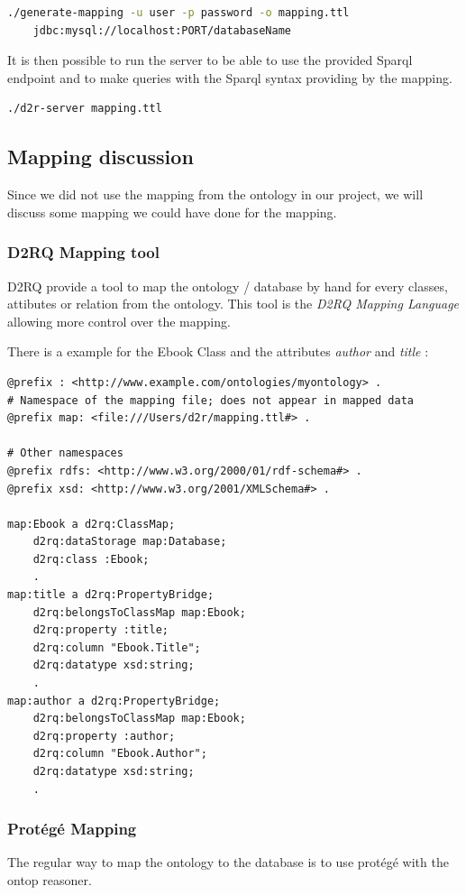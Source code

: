 \documentclass[a4paper,12pt]{article}
\begin{document}
\begin{lstlisting}[language=bash]
./generate-mapping -u user -p password -o mapping.ttl 
    jdbc:mysql://localhost:PORT/databaseName
\end{lstlisting}

It is then possible to run the server to be able to use the provided Sparql endpoint and to make queries with the Sparql syntax providing by the mapping.

\begin{lstlisting}
./d2r-server mapping.ttl
\end{lstlisting}

\subsection{Mapping discussion}
Since we did not use the mapping from the ontology in our project, we will discuss some mapping we could have done for the mapping.

\subsubsection{D2RQ Mapping tool}
D2RQ provide a tool to map the ontology / database by hand for every classes, attibutes or relation from the ontology. This tool is the \textit{D2RQ Mapping Language} allowing more control over the mapping.

There is a example for the Ebook Class and the attributes \textit{author} and \textit{title} : 

\begin{lstlisting}
@prefix : <http://www.example.com/ontologies/myontology> .
# Namespace of the mapping file; does not appear in mapped data
@prefix map: <file:///Users/d2r/mapping.ttl#> .

# Other namespaces
@prefix rdfs: <http://www.w3.org/2000/01/rdf-schema#> .
@prefix xsd: <http://www.w3.org/2001/XMLSchema#> .

map:Ebook a d2rq:ClassMap;
    d2rq:dataStorage map:Database;
    d2rq:class :Ebook;
    .
map:title a d2rq:PropertyBridge;
    d2rq:belongsToClassMap map:Ebook;
    d2rq:property :title;
    d2rq:column "Ebook.Title";
    d2rq:datatype xsd:string;
    .
map:author a d2rq:PropertyBridge;
    d2rq:belongsToClassMap map:Ebook;
    d2rq:property :author;
    d2rq:column "Ebook.Author"; 
    d2rq:datatype xsd:string;
    .
\end{lstlisting}

\subsubsection{Protégé Mapping}
The regular way to map the ontology to the database is to use protégé with the ontop reasoner.
\end{document}

